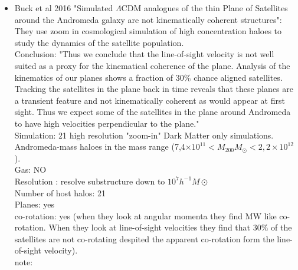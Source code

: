 \documentclass{emulateapj}
\begin{document}
\begin{itemize}
\item{Buck et al 2016 "Simulated $\Lambda$CDM analogues of the thin Plane of Satellites
around the Andromeda galaxy are not kinematically
coherent structures":\\
They use zoom in cosmological simulation of high concentration haloes to study the dynamics of the satellite population.\\
Conclusion: "Thus we conclude that the line-of-sight velocity is not well suited as a proxy for the kinematical coherence of the plane.
Analysis of the kinematics of our planes shows a fraction of 30$\%$ chance aligned
satellites. Tracking the satellites in the plane back in time reveals that these planes
are a transient feature and not kinematically coherent as would appear at first sight.
Thus we expect some of the satellites in the plane around Andromeda to have high
velocities perpendicular to the plane."\\
Simulation: 21 high resolution "zoom-in" Dark Matter only simulations. Andromeda-mass haloes in the mass range
(7,4$\times 10^{11} < M_{200}M_\odot < 2,2 \times 10^{12}$).\\
Gas: NO\\
Resolution : resolve substructure down to $10^7 h^{-1}M\odot$\\
Number of host halos: 21\\
Planes: yes\\
co-rotation: yes (when they look at angular momenta they find MW like co-rotation. When they look at line-of-sight velocities they find that 30$\%$ of the satellites are not co-rotating despited the apparent co-rotation form the line-of-sight velocity).\\
note: \\
}


\end{itemize}






\end{document}
